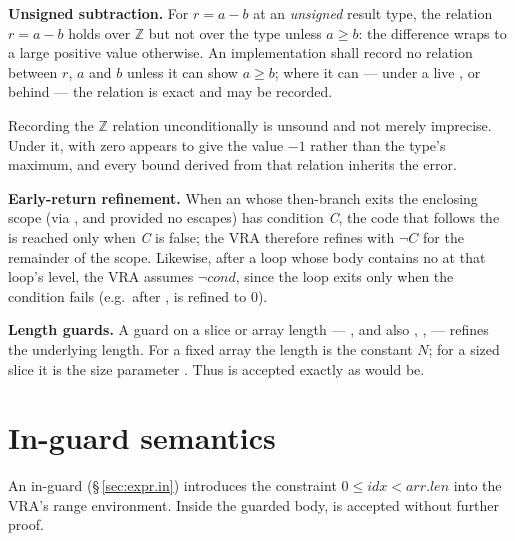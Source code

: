 \pnum
\textbf{Unsigned subtraction.}  For $r = a - b$ at an \emph{unsigned} result
type, the relation $r = a - b$ holds over $\mathbb{Z}$ but not over the type
unless $a \ge b$: the difference wraps to a large positive value otherwise.  An
implementation shall record no relation between $r$, $a$ and $b$ unless it can
show $a \ge b$; where it can ---  under a live , or
 behind  --- the relation is exact and
may be recorded.

\begin{note}
  Recording the $\mathbb{Z}$ relation unconditionally is unsound and not merely
  imprecise.  Under it,  with  zero appears to give
   the value $-1$ rather than the type's maximum, and every bound
  derived from that relation inherits the error.
\end{note}

\pnum
\textbf{Early-return refinement.}  When an  whose then-branch exits
the enclosing scope (via , and provided no  escapes)
has condition \textit{C}, the code that follows the  is reached only
when \textit{C} is false; the VRA therefore refines with $\lnot\textit{C}$
for the remainder of the scope.  Likewise, after a 
loop whose body contains no  at that loop's level, the VRA
assumes $\lnot\mathit{cond}$, since the loop exits only when the condition
fails (e.g.\ after ,  is refined to $0$).

\pnum
\textbf{Length guards.}  A guard on a slice or array length --- , and also , ,  ---
refines the underlying length.  For a fixed array  the length is
the constant $N$; for a sized slice  it is the size parameter
.  Thus  is accepted exactly as
 would be.

\section{In-guard semantics}
\label{sec:vra.in-guard}

\pnum
An in-guard  (\S\,\ref{sec:expr.in}) introduces the
constraint $0 \leq \mathit{idx} < \mathit{arr.len}$ into the VRA's
range environment.  Inside the guarded body,  is accepted
without further proof.

